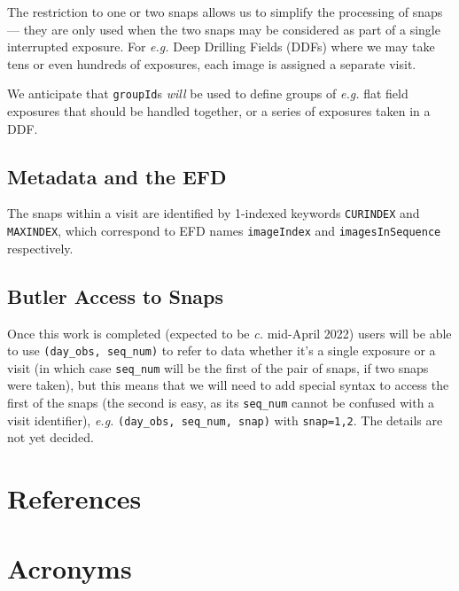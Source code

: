 \documentclass[SE,authoryear,toc]{lsstdoc}
\renewcommand{\eg}{\textit{e.g.}\xspace}
\begin{document}
The restriction to one or two snaps allows us to simplify the
processing of snaps --- they are only used when the two snaps may be considered as part
of a single interrupted exposure. For \eg Deep Drilling Fields (DDFs) where we may take tens
or even hundreds of exposures, each image is assigned a separate visit.

We anticipate that \texttt{groupId}s \textit{will} be used to define groups of \eg flat field
exposures that should be handled together, or a series of exposures taken in a DDF.  

\subsection{Metadata and the EFD}

The snaps within a visit are identified by 1-indexed keywords \texttt{CURINDEX} and \texttt{MAXINDEX},
which correspond to EFD names \texttt{imageIndex} and \texttt{imagesInSequence} respectively.

\subsection{Butler Access to Snaps}

Once this work is completed (expected to be \textit{c.} mid-April 2022) users will be able to use
\texttt{(day\_obs, seq\_num)} to refer to data whether it's a single exposure or a visit
(in which case \texttt{seq\_num} will be the first of the pair of snaps, if two snaps were taken), but
this means that we will need to add special syntax to access the first of the snaps (the second is easy,
as its \texttt{seq\_num} cannot be confused with a visit identifier), \eg
\texttt{(day\_obs, seq\_num, snap)} with \texttt{snap=1,2}.  The details are not yet decided.

\appendix
\section{References} \label{sec:bib}
\renewcommand{\refname}{} %


\section{Acronyms} \label{sec:acronyms}

\end{document}
